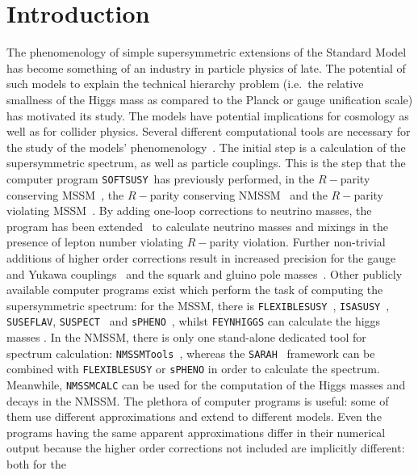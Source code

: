 \documentclass[final,3p,times,pdflatex]{elsarticle}
\def\SOFTSUSY{{\tt SOFTSUSY}}
\def\code#1{{\tt #1}}
\begin{document}
\section{Introduction}
The phenomenology of simple supersymmetric extensions of the Standard Model
has become something of an industry in particle physics of late. The potential
of such models to explain the technical hierarchy problem (i.e.\ the relative
smallness of the Higgs mass as compared to the Planck or gauge unification
scale) has motivated its study. The models have potential implications for
cosmology as well as for collider physics. Several different computational
tools are necessary for the study of the models'
phenomenology~\cite{Allanach:2008zn}. The initial step is a calculation of the
supersymmetric spectrum, as well as particle couplings. This is the step 
that the computer program \SOFTSUSY~has previously performed, in the
$R-$parity conserving MSSM~\cite{Allanach:2001kg}, the $R-$parity conserving
NMSSM~\cite{Allanach:2013kza} and the $R-$parity violating
MSSM~\cite{Allanach:2009bv}. By adding one-loop corrections to neutrino
masses, the program 
has been extended~\cite{Allanach:2011de} to calculate neutrino masses and
mixings in the presence of lepton number violating $R-$parity
violation. Further non-trivial 
additions of higher order corrections result in increased precision for the
gauge 
and Yukawa couplings~\cite{Allanach:2014nba} and the squark and gluino pole
masses~\cite{Allanach:2016rxd}. Other publicly available computer programs
exist which perform the task of computing the supersymmetric spectrum: for the
MSSM, there is \code{FLEXIBLESUSY}~\cite{Athron:2014yba}, 
\code{ISASUSY}~\cite{Paige:2003mg}, \code{SUSEFLAV},
\code{SUSPECT}~\cite{Djouadi:2002ze}
and \code{sPHENO}~\cite{Porod:2003um}, whilst \code{FEYNHIGGS} can calculate the
higgs masses \cite{Heinemeyer:1998yj}. In the NMSSM, there is only one
stand-alone dedicated tool for spectrum calculation:
\code{NMSSMTools}~\cite{Ellwanger:2004xm,Ellwanger:2006rn}, whereas the
\code{SARAH}~\cite{Staub:2013tta} framework can be combined with
\code{FLEXIBLESUSY} or \code{sPHENO} in order to calculate the spectrum. Meanwhile,
\code{NMSSMCALC} \cite{Baglio:2013iia} can be used for the computation of the Higgs masses
and decays in the NMSSM\@.
The plethora of computer programs is useful: some of them use different
approximations and extend to different models. Even the programs having the
same apparent approximations differ in their numerical output because the
higher order corrections not included are implicitly different: both for the
\end{document}
